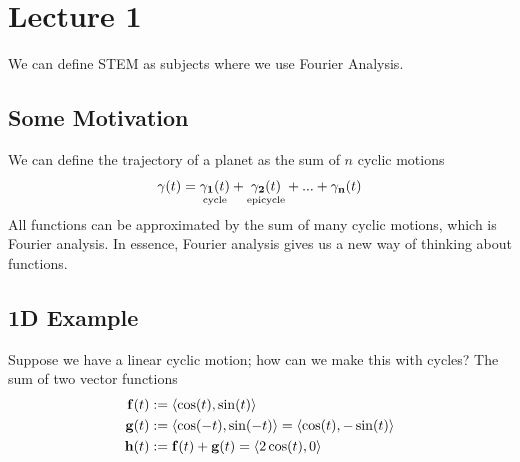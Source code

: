\section{Lecture 1}
We can define STEM as subjects where we use Fourier Analysis.
\subsection{Some Motivation}
We can define the trajectory of a planet as the sum of $n$ cyclic motions
\begin{align}
    \vb{\gamma}(t) = \underset{\text{cycle}}{\vb{\gamma_1}(t)} + \underset{\text{epicycle}}{\vb{\gamma_2}(t)} + ... + \vb{\gamma_n}(t)
\end{align}
All functions can be approximated by the sum of many cyclic motions, which is Fourier analysis. In essence, Fourier analysis gives us a new way of thinking about functions.

\subsection{1D Example}
Suppose we have a linear cyclic motion; how can we make this with cycles? The sum of two vector functions
\begin{align}
    \vb{f}(t) &:= \langle \cos(t), \sin(t) \rangle\\
    \vb{g}(t) &:= \langle \cos(-t), \sin(-t) \rangle = \langle \cos(t), -\sin(t) \rangle \\
    \vb{h}(t) &:= \vb{f}(t) + \vb{g}(t) = \langle 2\cos(t), 0 \rangle
\end{align}


